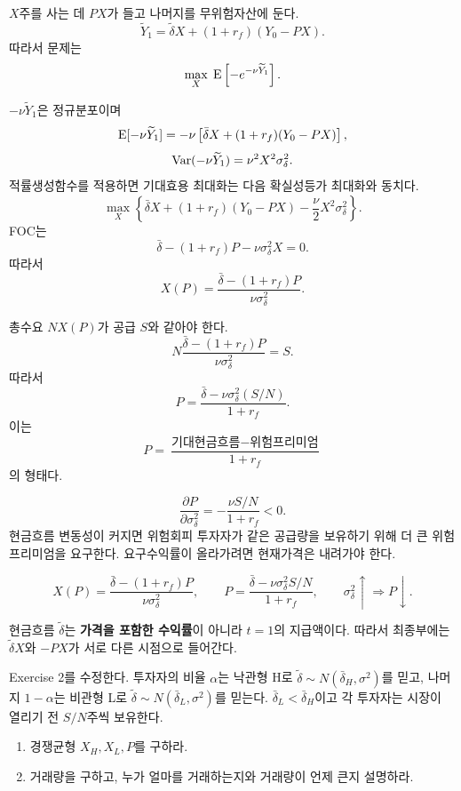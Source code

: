 \begin{solutionbox}
$X$주를 사는 데 $PX$가 들고 나머지를 무위험자산에 둔다.
\[
\widetilde Y_1=\widetilde\delta X+(1+r_f)(Y_0-PX).
\]
따라서 문제는
\[
\max_X\;\operatorname{E}\left[-e^{-\nu\widetilde Y_1}\right].
\]

$-\nu\widetilde Y_1$은 정규분포이며
\[
\operatorname{E}[-\nu\widetilde Y_1]
=-\nu\left[\bar\delta X+(1+r_f)(Y_0-PX)\right],
\]
\[
\operatorname{Var}(-\nu\widetilde Y_1)=\nu^2X^2\sigma_\delta^2.
\]
적률생성함수를 적용하면 기대효용 최대화는 다음 확실성등가 최대화와 동치다.
\[
\max_X\left\{\bar\delta X+(1+r_f)(Y_0-PX)-\frac\nu2X^2\sigma_\delta^2\right\}.
\]
FOC는
\[
\bar\delta-(1+r_f)P-\nu\sigma_\delta^2X=0.
\]
따라서
\[
\boxed{X(P)=\frac{\bar\delta-(1+r_f)P}{\nu\sigma_\delta^2}}.
\]

총수요 $NX(P)$가 공급 $S$와 같아야 한다.
\[
N\frac{\bar\delta-(1+r_f)P}{\nu\sigma_\delta^2}=S.
\]
따라서
\[
\boxed{P=\frac{\bar\delta-\nu\sigma_\delta^2(S/N)}{1+r_f}}.
\]
이는
\[
P=\frac{\text{기대현금흐름}-\text{위험프리미엄}}{1+r_f}
\]
의 형태다.

\[
\frac{\partial P}{\partial\sigma_\delta^2}
=-\frac{\nu S/N}{1+r_f}<0.
\]
현금흐름 변동성이 커지면 위험회피 투자자가 같은 공급량을 보유하기 위해 더 큰 위험프리미엄을 요구한다. 요구수익률이 올라가려면 현재가격은 내려가야 한다.
\end{solutionbox}

\begin{answerbox}
\[
X(P)=\frac{\bar\delta-(1+r_f)P}{\nu\sigma_\delta^2},
\qquad
P=\frac{\bar\delta-\nu\sigma_\delta^2S/N}{1+r_f},
\qquad
\sigma_\delta^2\uparrow\Rightarrow P\downarrow.
\]
\end{answerbox}

\begin{warningbox}
현금흐름 $\widetilde\delta$는 \textbf{가격을 포함한 수익률}이 아니라 $t=1$의 지급액이다. 따라서 최종부에는 $\widetilde\delta X$와 $-PX$가 서로 다른 시점으로 들어간다.
\end{warningbox}

\begin{officialbox}
Exercise 2를 수정한다. 투자자의 비율 $\alpha$는 낙관형 H로 $\widetilde\delta\sim N(\bar\delta_H,\sigma^2)$를 믿고, 나머지 $1-\alpha$는 비관형 L로 $\widetilde\delta\sim N(\bar\delta_L,\sigma^2)$를 믿는다. $\bar\delta_L<\bar\delta_H$이고 각 투자자는 시장이 열리기 전 $S/N$주씩 보유한다.
\begin{enumerate}[label=(\alph*)]
\item 경쟁균형 $X_H,X_L,P$를 구하라.
\item 거래량을 구하고, 누가 얼마를 거래하는지와 거래량이 언제 큰지 설명하라.
\end{enumerate}
\end{officialbox}

